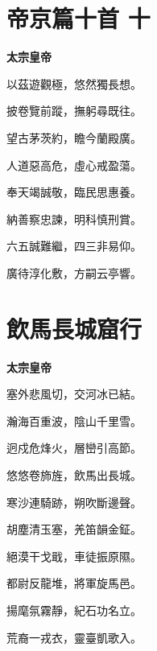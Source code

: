 \documentclass[12pt,a4paper]{ctexbook}
\begin{document}
\section{帝京篇十首 十}
\textbf{太宗皇帝}\par\vspace{0.5em}
以茲遊觀極，悠然獨長想。\par
披卷覽前蹤，撫躬尋既往。\par
望古茅茨約，瞻今蘭殿廣。\par
人道惡高危，虛心戒盈蕩。\par
奉天竭誠敬，臨民思惠養。\par
納善察忠諫，明科慎刑賞。\par
六五誠難繼，四三非易仰。\par
廣待淳化敷，方嗣云亭響。\par

\section{飲馬長城窟行}
\textbf{太宗皇帝}\par\vspace{0.5em}
塞外悲風切，交河冰已結。\par
瀚海百重波，陰山千里雪。\par
迥戍危烽火，層巒引高節。\par
悠悠卷斾旌，飲馬出長城。\par
寒沙連騎跡，朔吹斷邊聲。\par
胡塵清玉塞，羌笛韻金鉦。\par
絕漠干戈戢，車徒振原隰。\par
都尉反龍堆，將軍旋馬邑。\par
揚麾氛霧靜，紀石功名立。\par
荒裔一戎衣，靈臺凱歌入。\par
\end{document}
